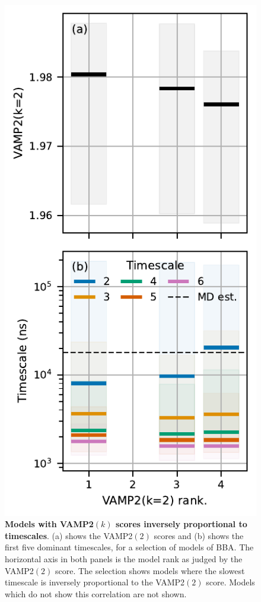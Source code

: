 \documentclass[journal=jacsat,manuscript=article]{achemso}
\begin{document}
\begin{figure}[ht]
    \centering
    \includegraphics{results2/bad_vamp_ranks.pdf}
    \caption{\textbf{Models with VAMP2$(k)$ scores inversely proportional to timescales}. (a) shows the VAMP2$(2)$ scores and (b) shows the first five dominant timescales, for a selection of models of BBA. The horizontal axis in both panels is the model rank as judged by the VAMP2$(2)$ score. The selection shows models where the slowest timescale is inversely proportional to the VAMP2$(2)$ score. Models which do not show this correlation are not shown. }
    \label{fig:bad_vamp_scores}
\end{figure}
\end{document}
